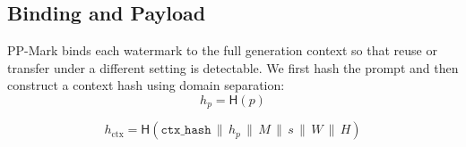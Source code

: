 \documentclass{article}
\theoremstyle{plain}
\theoremstyle{definition}
\theoremstyle{remark}
\begin{document}


\subsection{Binding and Payload}
PP-Mark binds each watermark to the full generation context so that reuse or transfer under a different setting is detectable. We first hash the prompt and then construct a context hash using domain separation:
\begin{equation}
h_p = \mathsf{H}(p)
\end{equation}

\begin{equation}
h_{\mathrm{ctx}} = \mathsf{H}(\texttt{ctx\_hash} \,\|\, h_p \,\|\, M \,\|\, s \,\|\, W \,\|\, H)
\end{equation}
\end{document}
